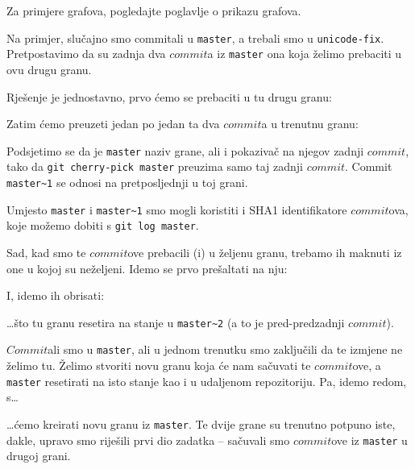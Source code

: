 Za primjere grafova, pogledajte poglavlje o prikazu grafova.


Na primjer, slučajno smo commitali u \verb+master+, a trebali smo u \verb+unicode-fix+.
Pretpostavimo da su zadnja dva $commit$a iz \verb+master+ ona koja želimo prebaciti u ovu drugu granu.

Rješenje je jednostavno, prvo ćemo se prebaciti u tu drugu granu:


Zatim ćemo preuzeti jedan po jedan ta dva $commit$a u trenutnu granu:


Podsjetimo se da je \verb+master+ naziv grane, ali i pokazivač na njegov zadnji $commit$, tako da \verb+git cherry-pick master+ preuzima samo taj zadnji $commit$.
Commit \verb+master~1+ se odnosi na pretposljednji u toj grani.

Umjesto \verb+master+ i \verb+master~1+ smo mogli koristiti i SHA1 identifikatore $commit$ova, koje možemo dobiti s \verb+git log master+.

Sad, kad smo te $commit$ove prebacili (i) u željenu granu, trebamo ih maknuti iz one u kojoj su neželjeni.
Idemo se prvo prešaltati na nju:


I, idemo ih obrisati:


\dots{}što tu granu resetira na stanje u \verb+master~2+ (a to je pred-predzadnji $commit$).


$Commit$ali smo u \verb+master+, ali u jednom trenutku smo zaključili da te izmjene ne želimo tu.
Želimo stvoriti novu granu koja će nam sačuvati te $commit$ove, a \verb+master+ resetirati na isto stanje kao i u udaljenom repozitoriju.
Pa, idemo redom, s\dots


\dots{}ćemo kreirati novu granu iz \verb+master+.
Te dvije grane su trenutno potpuno iste, dakle, upravo smo riješili prvi dio zadatka -- sačuvali smo $commit$ove iz \verb+master+ u drugoj grani.

